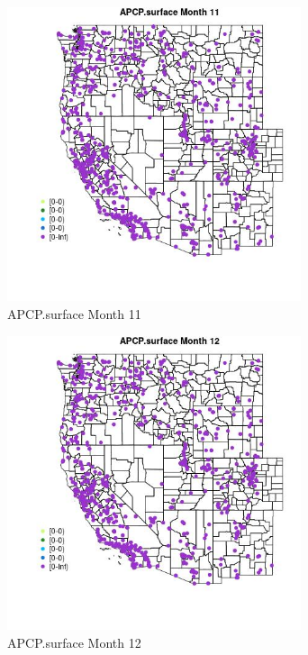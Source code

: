 \begin{figure} 
\centering  
\includegraphics[width=0.77\textwidth]{Code_Outputs/Report_ML_input_PM25_Step4_part_f_de_duplicated_aves_prioritize_24hr_obswNAs_MapObsMo11APCPsurface.jpg} 
\caption{\label{fig:Report_ML_input_PM25_Step4_part_f_de_duplicated_aves_prioritize_24hr_obswNAsMapObsMo11APCPsurface}APCP.surface Month 11} 
\end{figure} 
 

\clearpage 

\begin{figure} 
\centering  
\includegraphics[width=0.77\textwidth]{Code_Outputs/Report_ML_input_PM25_Step4_part_f_de_duplicated_aves_prioritize_24hr_obswNAs_MapObsMo12APCPsurface.jpg} 
\caption{\label{fig:Report_ML_input_PM25_Step4_part_f_de_duplicated_aves_prioritize_24hr_obswNAsMapObsMo12APCPsurface}APCP.surface Month 12} 
\end{figure} 
 

